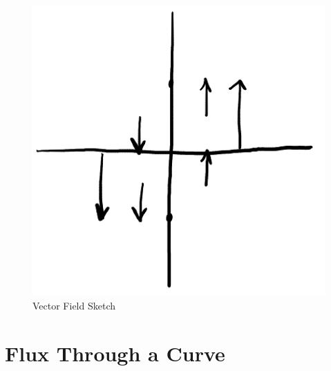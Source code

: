 \documentclass{article}
\begin{document}
\begin{enumerate}[1.]
    \begin{figure}[H]
      \centering
      \includegraphics[scale=0.45]{"VectorFieldSketch2"}
      \caption{Vector Field Sketch}
    \end{figure}

\end{enumerate}

\section{Flux Through a Curve}
\end{document}

